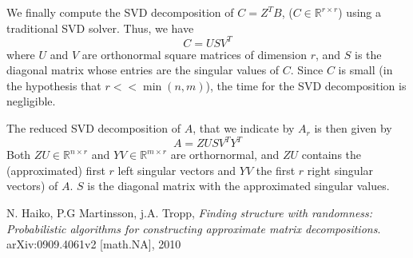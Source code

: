 \documentclass{article}
\begin{document}
We finally compute the SVD decomposition of $C = Z^T B$, ($C\in\mathbb{R}^{r\times r}$) using a traditional SVD solver.
Thus, we have
\[
  C = USV^T
\]
where $U$ and $V$ are orthonormal square matrices of dimension $r$, and $S$ is the
diagonal matrix whose entries are the singular values of $C$. Since $C$
is small (in the hypothesis that $r<<\min(n,m)$), the time for the SVD decomposition
is negligible.

The reduced SVD decomposition of  $A$, that we indicate by $A_r$ is then given by
\[
A = ZUSV^TY^T
\]
Both $ZU\in\mathbb{R}^{n\times r}$ and $YV\in\mathbb{R}^{m\times r}$ are orthornormal, and $ZU$ contains
the (approximated) first $r$ 
left singular vectors and $YV$
the first $r$ right singular vectors) of $A$. $S$ is the diagonal matrix with the approximated singular values.

\begin{thebibliography}{10}

{\sc N. Haiko, P.G Martinsson, j.A. Tropp}, {\em Finding structure with randomness: Probabilistic algorithms for constructing approximate matrix decompositions}.
\newblock arXiv:0909.4061v2 [math.NA], 2010
\end{thebibliography}
\end{document}
